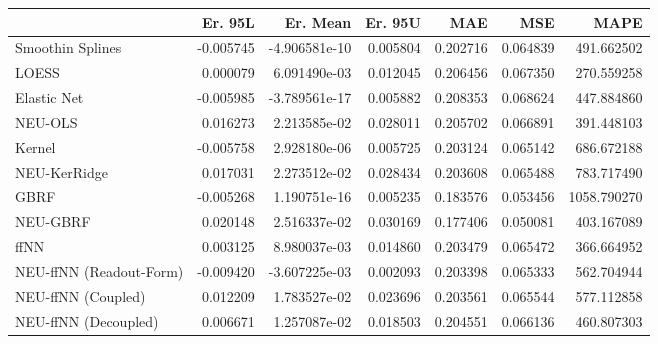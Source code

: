 \begin{tabular}{lrrrrrr}
\toprule
{} &   Er. 95L &      Er. Mean &   Er. 95U &       MAE &       MSE &         MAPE \\
\midrule
Smoothin Splines        & -0.005745 & -4.906581e-10 &  0.005804 &  0.202716 &  0.064839 &   491.662502 \\
LOESS                   &  0.000079 &  6.091490e-03 &  0.012045 &  0.206456 &  0.067350 &   270.559258 \\
Elastic Net             & -0.005985 & -3.789561e-17 &  0.005882 &  0.208353 &  0.068624 &   447.884860 \\
NEU-OLS                 &  0.016273 &  2.213585e-02 &  0.028011 &  0.205702 &  0.066891 &   391.448103 \\
Kernel                  & -0.005758 &  2.928180e-06 &  0.005725 &  0.203124 &  0.065142 &   686.672188 \\
NEU-KerRidge            &  0.017031 &  2.273512e-02 &  0.028434 &  0.203608 &  0.065488 &   783.717490 \\
GBRF                    & -0.005268 &  1.190751e-16 &  0.005235 &  0.183576 &  0.053456 &  1058.790270 \\
NEU-GBRF                &  0.020148 &  2.516337e-02 &  0.030169 &  0.177406 &  0.050081 &   403.167089 \\
ffNN                    &  0.003125 &  8.980037e-03 &  0.014860 &  0.203479 &  0.065472 &   366.664952 \\
NEU-ffNN (Readout-Form) & -0.009420 & -3.607225e-03 &  0.002093 &  0.203398 &  0.065333 &   562.704944 \\
NEU-ffNN (Coupled)      &  0.012209 &  1.783527e-02 &  0.023696 &  0.203561 &  0.065544 &   577.112858 \\
NEU-ffNN (Decoupled)    &  0.006671 &  1.257087e-02 &  0.018503 &  0.204551 &  0.066136 &   460.807303 \\
\bottomrule
\end{tabular}
